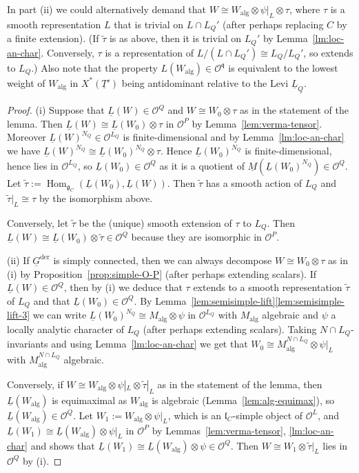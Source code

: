 \documentclass[a4paper]{amsart}
\numberwithin{equation}{section}
\theoremstyle{remark}
\theoremstyle{definition}
\DeclareMathOperator{\Hom}{Hom}
\newcommand{\alggrp}[1]{\underline{#1}}
\newcommand{\der}{\mathrm{der}}
\newcommand{\alg}{\mathrm{alg}}
\newcommand{\wt}[1]{\widetilde{#1}}
\begin{document}
In part (ii) we could alternatively demand that $W \cong W_\alg \otimes \psi|_L \otimes \tau$, where $\tau$ is a smooth representation $L$ that is trivial on $L \cap L_Q'$ (after perhaps replacing $C$ by a finite extension).
(If $\wt\tau$ is as above, then it is trivial on $L_Q'$ by Lemma~\ref{lm:loc-an-char}.
Conversely, $\tau$ is a representation of $L/(L \cap L_Q') \cong L_Q/L_Q'$, so extends to $L_Q$.)
Also note that the property $L(W_\alg) \in {\mathcal O}^{\mathfrak{q}}$ is equivalent to the lowest weight of $W_\alg$ in $X^*(\alggrp T')$ being antidominant relative to the Levi $\alggrp L_{\alggrp Q}$.

\begin{proof}
  (i) Suppose that $\underline L(W) \in {\mathcal O}^Q$ and $W \cong W_0 \otimes \tau$ as in the statement of the lemma.
  Then $\underline L(W) \cong \underline L(W_0) \otimes \tau$ in $\mathcal O^P$ by Lemma~\ref{lem:verma-tensor}.
  Moreover $\underline L(W)^{N_Q} \in \mathcal O^{L_Q}$ is finite-dimensional and by Lemma~\ref{lm:loc-an-char} we have $\underline L(W)^{N_Q} \cong \underline L(W_0)^{N_Q} \otimes \tau$.
  Hence $\underline L(W_0)^{N_Q}$ is finite-dimensional, hence lies in $\mathcal O^{L_Q}$, so $\underline L(W_0) \in \mathcal O^Q$ as it is a quotient of $\underline M(\underline L(W_0)^{N_Q}) \in \mathcal O^Q$.
  Let $\wt\tau := \Hom_{\mathfrak g_C}(\underline L(W_0),\underline L(W))$.
  Then $\wt\tau$ has a smooth action of $L_Q$ and $\wt\tau|_L \cong \tau$ by the isomorphism above.

  Conversely, let $\wt\tau$ be the (unique) smooth extension of $\tau$ to $L_Q$.
  Then $\underline L(W) \cong \underline L(W_0) \otimes \wt\tau \in \mathcal O^Q$ because they are isomorphic in $\mathcal O^P$.

  (ii) If $\alggrp{G}^{\der}$ is simply connected, then we can always decompose $W \cong W_0 \otimes \tau$ as in (i) by Proposition~\ref{prop:simple-O-P} (after perhaps extending scalars).
  If $\underline L(W) \in {\mathcal O}^Q$, then by (i) we deduce that $\tau$ extends to a smooth representation $\wt\tau$ of $L_Q$ and that $\underline L(W_0) \in {\mathcal O}^{Q}$.
  By Lemma~\ref{lem:semisimple-lift}\ref{lem:semisimple-lift-3} we can write $\underline L(W_0)^{N_Q} \cong M_\alg \otimes \psi$ in $\mathcal O^{L_Q}$ with $M_\alg$ algebraic and $\psi$ a locally analytic character of $L_Q$ (after perhaps extending scalars).
  Taking $N \cap L_Q$-invariants and using Lemma~\ref{lm:loc-an-char} we get that $W_0 \cong M_\alg^{N \cap L_Q} \otimes \psi|_L$ with $M_\alg^{N \cap L_Q}$ algebraic.

  Conversely, if $W \cong W_\alg \otimes \psi|_L \otimes \wt\tau|_L$ as in the statement of the lemma, then $\underline L(W_\alg)$ is equimaximal as $W_\alg$ is algebraic (Lemma~\ref{lem:alg-equimax}), so $\underline L(W_\alg) \in \mathcal O^Q$.
  Let $W_1 := W_\alg \otimes \psi|_L$, which is an $\mathfrak l_C$-simple object of $\mathcal O^L$, and $\underline L(W_1) \cong \underline L(W_\alg) \otimes \psi|_L$ in $\mathcal O^P$ by Lemmas~\ref{lem:verma-tensor}, \ref{lm:loc-an-char} and shows that $\underline L(W_1) \cong \underline L(W_\alg) \otimes \psi\in \mathcal O^Q$.
  Then $W \cong W_1 \otimes \wt\tau|_L$ lies in $\mathcal O^Q$ by (i).
\end{proof}
\end{document}
